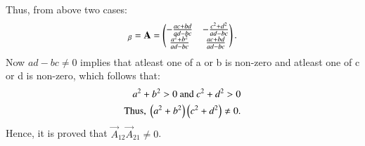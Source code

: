 \documentclass[journal,12pt,twocolumn]{IEEEtran}
\begin{document}
Thus, from above two cases:
\begin{align}
    [\vec{T}]_\beta = \vec{A} = \myvec{-\frac{ac+bd}{ad-bc} & -\frac{c^2+d^2}{ad-bc} \\ \frac{a^2+b^2}{ad-bc} & \frac{ac+bd}{ad-bc}}.
\end{align}
Now $ad-bc \neq 0$ implies that atleast one of a or b is non-zero and atleast one of c or d is non-zero, which follows that:
\begin{align}
    a^2 + b^2 > 0 \text{ and } c^2 + d^2 > 0 \\
    \text{Thus, } \left(a^2+b^2\right)\left(c^2+d^2\right) \neq 0.
\end{align}
Hence, it is proved that $\vec{A}_{12}\vec{A}_{21} \neq 0$.
\end{document}
